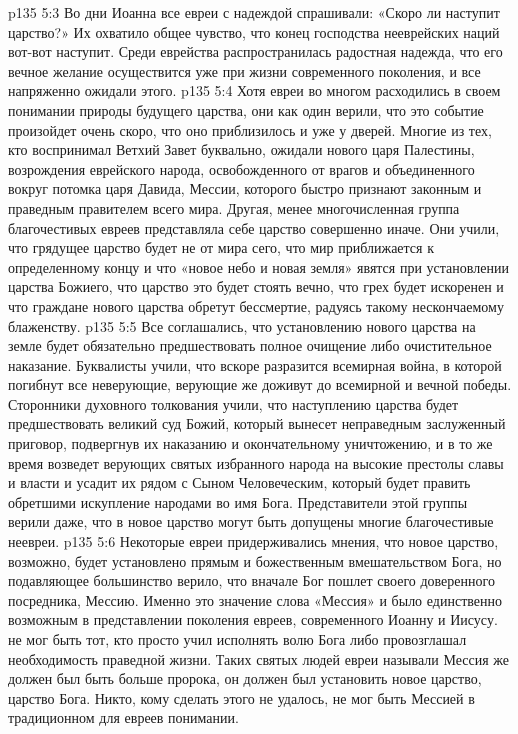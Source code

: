 \vs p135 5:3 Во дни Иоанна все евреи с надеждой спрашивали: «Скоро ли наступит царство?» Их охватило общее чувство, что конец господства нееврейских наций вот\hyp{}вот наступит. Среди еврейства распространилась радостная надежда, что его вечное желание осуществится уже при жизни современного поколения, и все напряженно ожидали этого.
\vs p135 5:4 Хотя евреи во многом расходились в своем понимании природы будущего царства, они как один верили, что это событие произойдет очень скоро, что оно приблизилось и уже у дверей. Многие из тех, кто воспринимал Ветхий Завет буквально, ожидали нового царя Палестины, возрождения еврейского народа, освобожденного от врагов и объединенного вокруг потомка царя Давида, Мессии, которого быстро признают законным и праведным правителем всего мира. Другая, менее многочисленная группа благочестивых евреев представляла себе царство совершенно иначе. Они учили, что грядущее царство будет не от мира сего, что мир приближается к определенному концу и что «новое небо и новая земля» явятся при установлении царства Божиего, что царство это будет стоять вечно, что грех будет искоренен и что граждане нового царства обретут бессмертие, радуясь такому нескончаемому блаженству.
\vs p135 5:5 Все соглашались, что установлению нового царства на земле будет обязательно предшествовать полное очищение либо очистительное наказание. Буквалисты учили, что вскоре разразится всемирная война, в которой погибнут все неверующие, верующие же доживут до всемирной и вечной победы. Сторонники духовного толкования учили, что наступлению царства будет предшествовать великий суд Божий, который вынесет неправедным заслуженный приговор, подвергнув их наказанию и окончательному уничтожению, и в то же время возведет верующих святых избранного народа на высокие престолы славы и власти и усадит их рядом с Сыном Человеческим, который будет править обретшими искупление народами во имя Бога. Представители этой группы верили даже, что в новое царство могут быть допущены многие благочестивые неевреи.
\vs p135 5:6 Некоторые евреи придерживались мнения, что новое царство, возможно, будет установлено прямым и божественным вмешательством Бога, но подавляющее большинство верило, что вначале Бог пошлет своего доверенного посредника, Мессию. Именно это значение слова «Мессия» и было единственно возможным в представлении поколения евреев, современного Иоанну и Иисусу.  не мог быть тот, кто просто учил исполнять волю Бога либо провозглашал необходимость праведной жизни. Таких святых людей евреи называли  Мессия же должен был быть больше пророка, он должен был установить новое царство, царство Бога. Никто, кому сделать этого не удалось, не мог быть Мессией в традиционном для евреев понимании.
